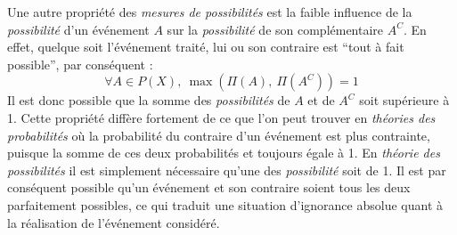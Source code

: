 Une autre propriété des \emph{mesures de possibilités} est la faible
influence de la \emph{possibilité} d'un événement \(A\) sur la
\emph{possibilité} de son complémentaire \(A^C\). En effet, quelque
soit l’événement traité, lui ou son contraire est \enquote{tout à fait
  possible}, par conséquent :
%
\begin{equation}
  \label{eq:poss_cont}
  ∀ A ∈ P(X),\ \max(Π(A),\ Π(A^C)) = 1  
\end{equation}
%
Il est donc possible que la somme des \emph{possibilités} de \(A\) et
de \(A^C\) soit supérieure à 1. Cette propriété diffère fortement de
ce que l'on peut trouver en \emph{théories des probabilités} où la
probabilité du contraire d'un événement est plus contrainte, puisque
la somme de ces deux probabilités et toujours égale à 1. En
\emph{théorie des possibilités} il est simplement nécessaire qu'une
des \emph{possibilité} soit de 1. Il est par conséquent possible qu'un
événement et son contraire soient tous les deux parfaitement
possibles, ce qui traduit une situation d'ignorance absolue quant à la
réalisation de l'événement considéré.

